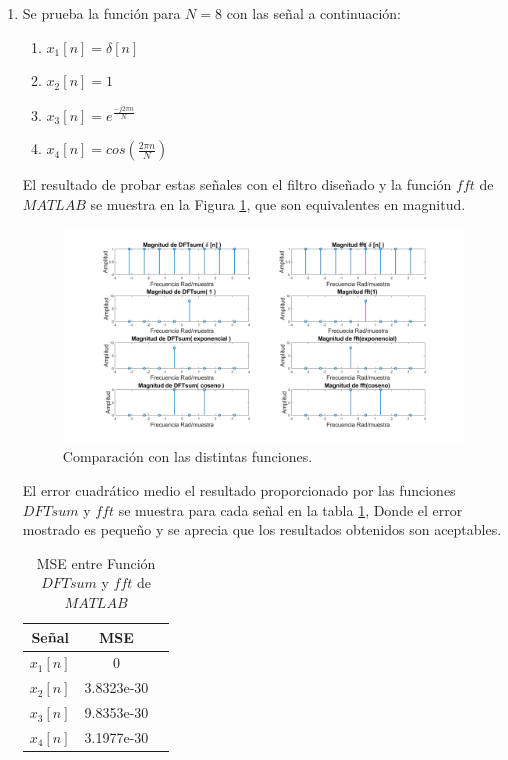 \documentclass[letterpaper,onecolumn,10pt,journal,final]{IEEEtran}
\begin{document}
\begin{enumerate}[1)]
    \item%

Se prueba la función para $N = 8$ con las señal a continuación:
\begin{enumerate}
    \item $x_1[n] = \delta [n]$ 
    \item $x_2[n] = 1$
    \item $x_3[n] = e^{\frac {-j 2 \pi n}{N}}$
    \item $x_4[n] = cos( \frac{2 \pi n}{N})$
\end{enumerate}
El resultado de probar estas señales con el filtro diseñado y la función $fft$ de $MATLAB$ se muestra en la Figura \ref{IV1}, que son equivalentes en magnitud.

\begin{figure}[H]
\centering
\includegraphics[width=1 \linewidth]{Figuras/IV1.png}
\caption{Comparación con las distintas funciones.}
\label{IV1}
\end{figure}

El error cuadrático medio el resultado proporcionado por las funciones $DFTsum$ y $fft$ se muestra para cada señal en la tabla \ref{tab:1}, Donde el error mostrado es pequeño y se aprecia que los resultados obtenidos son aceptables.

\begin{table}[H]
        \centering
        \begin{tabular}{|c|c|c|}
        \hline
            Señal     & MSE \\ \hline
            $x_1[n]$ & 0 \\
            $x_2[n]$ & 3.8323e-30 \\
            $x_3[n]$ & 9.8353e-30 \\
            $x_4[n]$ & 3.1977e-30 \\\hline
        \end{tabular}
        \caption{MSE entre Función $DFTsum$ y $fft$ de $MATLAB$}
        \label{tab:1}
\end{table}


\end{enumerate}
\end{document}

